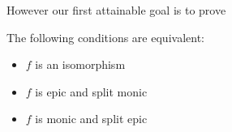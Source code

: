 \documentclass[a4paper,openany]{amsbook}
\begin{document}
However our first attainable goal is to prove

\begin{theorem}
The following conditions are equivalent:
\begin{itemize}
  \item $f$ is an isomorphism
  \item $f$ is epic and split monic
  \item $f$ is monic and split epic
\end{itemize}
\end{theorem}




\end{document}
